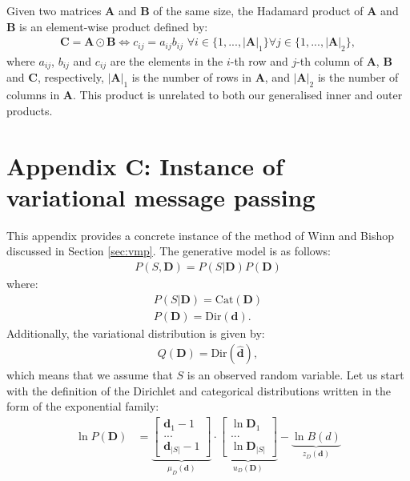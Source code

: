 \documentclass[twoside,11pt]{article}
\begin{document}
Given two matrices $\bm{A}$ and $\bm{B}$ of the same size, the Hadamard product of $\bm{A}$ and $\bm{B}$ is an element-wise product defined by:
\begin{align}
\bm{C} = \bm{A} \odot \bm{B} \Leftrightarrow c_{ij} = a_{ij} b_{ij} \,\,\forall i \in \{1, ..., |\bm{A}|_1\} \forall j \in \{1, ..., |\bm{A}|_2\},
\end{align}
where $a_{ij}$, $b_{ij}$ and $c_{ij}$ are the elements in the $i$-th row and $j$-th column of $\bm{A}$, $\bm{B}$ and $\bm{C}$, respectively, $|\bm{A}|_1$ is the number of rows in $\bm{A}$, and $|\bm{A}|_2$ is the number of columns in $\bm{A}$. This product is unrelated to both our generalised inner and outer products.

\section*{Appendix C: Instance of variational message passing}

This appendix provides a concrete instance of the method of Winn and Bishop discussed in Section \ref{sec:vmp}. The generative model is as follows:
\begin{align}
P(S,\bm{D}) = P(S|\bm{D})P(\bm{D})
\end{align}
where:
\begin{align}
P(S|\bm{D}) = \text{Cat}(\bm{D})\\
P(\bm{D}) = \text{Dir}(\bm{d}).
\end{align}
Additionally, the variational distribution is given by:
\begin{align}
Q(\bm{D}) = \text{Dir}(\bm{\hat{d}}),
\end{align}
which means that we assume that $S$ is an observed random variable. Let us start with the definition of the Dirichlet and categorical distributions written in the form of the exponential family:
\begin{align}\label{eq:D:0}
\ln P(\bm{D}) &= \underbrace{\begin{bmatrix}
\bm{d}_1 - 1\\
...\\
\bm{d}_{|S|} - 1
\end{bmatrix}}_{\mu_{D}(\bm{d})} \cdot
\underbrace{\begin{bmatrix}
\ln \bm{D}_1\\
...\\
\ln \bm{D}_{|S|}
\end{bmatrix}}_{u_{D}(\bm{D})} - 
\underbrace{\ln B(d)}_{z_{D}(\bm{d})}
\end{align}
\end{document}
